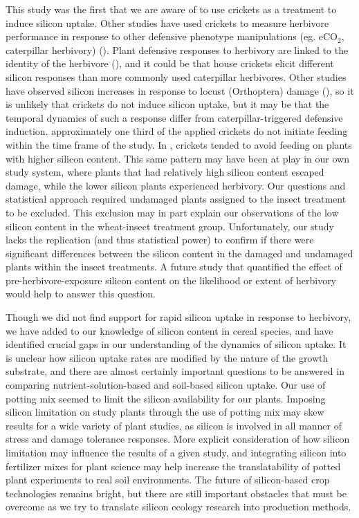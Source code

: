 \documentclass[12pt, letterpaper, ]{report}
\begin{document}
This study was the first that we are aware of to use crickets as a treatment to induce silicon uptake. Other studies have used crickets to measure herbivore performance in response to other defensive phenotype manipulations (eg. eCO$_2$, caterpillar herbivory) (\cite{biru_contrasting_2022, ryalls_impacts_2017}). Plant defensive responses to herbivory are linked to the identity of the herbivore (\cite{afkhami_endophyte-mediated_2009, amsberry_effects_2006}), and it could be that house crickets elicit different silicon responses than more commonly used caterpillar herbivores. Other studies have observed silicon increases in response to locust (Orthoptera) damage (\cite{massey_herbivore_2007, garbuzov_interactive_2011}), so it is unlikely that crickets do not induce silicon uptake, but it may be that the temporal dynamics of such a response differ from caterpillar-triggered defensive induction. approximately one third of the applied crickets do not initiate feeding within the time frame of the study. In \textcite{massey_herbivore_2007}, crickets tended to avoid feeding on plants with higher silicon content. This same pattern may have been at play in our own study system, where plants that had relatively high silicon content escaped damage, while the lower silicon plants experienced herbivory. Our questions and statistical approach required undamaged plants assigned to the insect treatment to be excluded. This exclusion may in part explain our observations of the low silicon content in the wheat-insect treatment group. Unfortunately, our study lacks the replication (and thus statistical power) to confirm if there were significant differences between the silicon content in the damaged and undamaged plants within the insect treatments. A future study that quantified the effect of pre-herbivore-exposure silicon content on the likelihood or extent of herbivory would help to answer this question.

Though we did not find support for rapid silicon uptake in response to herbivory, we have added to our knowledge of silicon content in cereal species, and have identified crucial gaps in our understanding of the dynamics of silicon uptake. It is unclear how silicon uptake rates are modified by the nature of the growth substrate, and there are almost certainly important questions to be answered in comparing nutrient-solution-based and soil-based silicon uptake. Our use of potting mix seemed to limit the silicon availability for our plants. Imposing silicon limitation on study plants through the use of potting mix may skew results for a wide variety of plant studies, as silicon is involved in all manner of stress and damage tolerance responses. More explicit consideration of how silicon limitation may influence the results of a given study, and integrating silicon into fertilizer mixes for plant science may help increase the translatability of potted plant experiments to real soil environments. The future of silicon-based crop technologies remains bright, but there are still important obstacles that must be overcome as we try to translate silicon ecology research into production methods.
\end{document}
